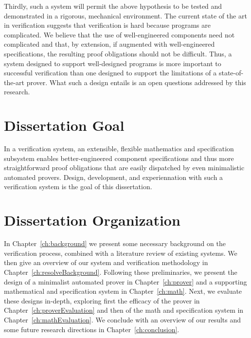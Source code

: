 Thirdly, such a system will permit the above hypothesis to be tested and demonstrated in a rigorous, mechanical environment.  The current state of the art in verification suggests that verification is hard because programs are complicated.  We believe that the use of well-engineered components need not complicated and that, by extension, if augmented with well-engineered specifications, the resulting proof obligations should not be difficult.  Thus, a system designed to support well-designed programs is more important to successful verification than one designed to support the limitations of a state-of-the-art prover.  What such a design entails is an open questions addressed by this research.

\section{Dissertation Goal}
In a verification system, an extensible, flexible mathematics and specification subsystem enables better-engineered component specifications and thus more straightforward proof obligations that are easily dispatched by even minimalistic automated provers.  Design, development, and experiennation with such a verification system is the goal of this dissertation.  

\section{Dissertation Organization}
In Chapter~\ref{ch:background} we present some necessary background on the verification process, combined with a literature review of existing systems.  We then give an overview of our system and verification methodology in Chapter~\ref{ch:resolveBackground}.  Following these preliminaries, we present the design of a minimalist automated prover in Chapter~\ref{ch:prover} and a supporting mathematical and specification system in Chapter~\ref{ch:math}.  Next, we evaluate these designs in-depth, exploring first the efficacy of the prover in Chapter~\ref{ch:proverEvaluation} and then of the math and specification system in Chapter~\ref{ch:mathEvaluation}.  We conclude with an overview of our results and some future research directions in Chapter~\ref{ch:conclusion}.
